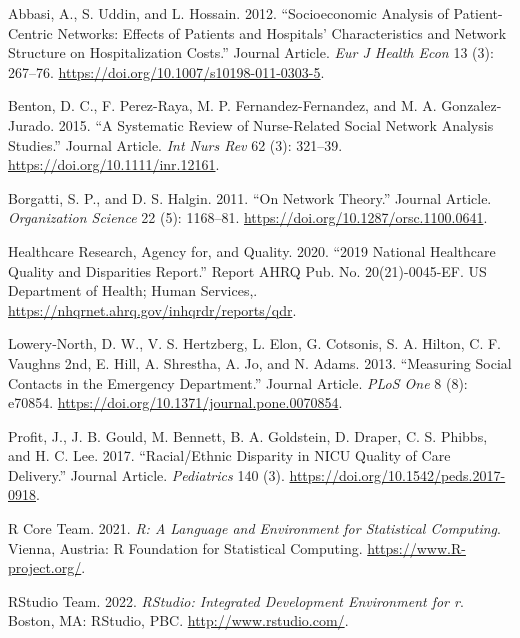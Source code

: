 \documentclass[
]{article}
\newlength{\cslhangindent}
\newlength{\cslentryspacingunit} %
\newenvironment{CSLReferences}[2] %
 {%
  \setlength{\parindent}{0pt}
  \ifodd #1
  \let\oldpar\par
  \def\par{\hangindent=\cslhangindent\oldpar}
  \fi
  \setlength{\parskip}{#2\cslentryspacingunit}
 }%
 {}
\begin{document}
\hypertarget{refs}{}
\begin{CSLReferences}{1}{0}
\leavevmode{}%
Abbasi, A., S. Uddin, and L. Hossain. 2012. {``Socioeconomic Analysis of
Patient-Centric Networks: Effects of Patients and Hospitals'
Characteristics and Network Structure on Hospitalization Costs.''}
Journal Article. \emph{Eur J Health Econ} 13 (3): 267--76.
\url{https://doi.org/10.1007/s10198-011-0303-5}.

\leavevmode{}%
Benton, D. C., F. Perez-Raya, M. P. Fernandez-Fernandez, and M. A.
Gonzalez-Jurado. 2015. {``A Systematic Review of Nurse-Related Social
Network Analysis Studies.''} Journal Article. \emph{Int Nurs Rev} 62
(3): 321--39. \url{https://doi.org/10.1111/inr.12161}.

\leavevmode{}%
Borgatti, S. P., and D. S. Halgin. 2011. {``On Network Theory.''}
Journal Article. \emph{Organization Science} 22 (5): 1168--81.
\url{https://doi.org/10.1287/orsc.1100.0641}.

\leavevmode{}%
Healthcare Research, Agency for, and Quality. 2020. {``2019 National
Healthcare Quality and Disparities Report.''} Report AHRQ Pub. No.
20(21)-0045-EF. US Department of Health; Human Services,.
\url{https://nhqrnet.ahrq.gov/inhqrdr/reports/qdr}.

\leavevmode{}%
Lowery-North, D. W., V. S. Hertzberg, L. Elon, G. Cotsonis, S. A.
Hilton, C. F. Vaughns 2nd, E. Hill, A. Shrestha, A. Jo, and N. Adams.
2013. {``Measuring Social Contacts in the Emergency Department.''}
Journal Article. \emph{PLoS One} 8 (8): e70854.
\url{https://doi.org/10.1371/journal.pone.0070854}.

\leavevmode{}%
Profit, J., J. B. Gould, M. Bennett, B. A. Goldstein, D. Draper, C. S.
Phibbs, and H. C. Lee. 2017. {``Racial/Ethnic Disparity in NICU Quality
of Care Delivery.''} Journal Article. \emph{Pediatrics} 140 (3).
\url{https://doi.org/10.1542/peds.2017-0918}.

\leavevmode{}%
R Core Team. 2021. \emph{R: A Language and Environment for Statistical
Computing}. Vienna, Austria: R Foundation for Statistical Computing.
\url{https://www.R-project.org/}.

\leavevmode{}%
RStudio Team. 2022. \emph{RStudio: Integrated Development Environment
for r}. Boston, MA: RStudio, PBC. \url{http://www.rstudio.com/}.


\end{CSLReferences}
\end{document}
